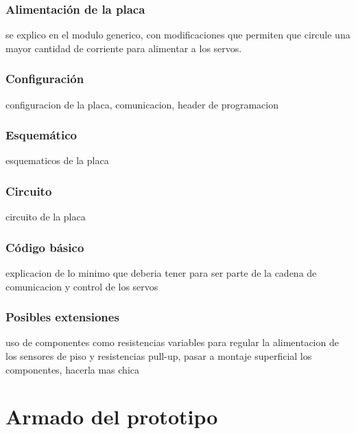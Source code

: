 \subsubsection{Alimentaci\'on de la placa}
\label{h_placas_servos_alimentacion}

se explico en el modulo generico, con modificaciones que permiten que circule una mayor cantidad de corriente para alimentar a los servos.

\subsubsection{Configuraci\'on}
\label{h_placas_servos_config}

configuracion de la placa, comunicacion, header de programacion

\subsubsection{Esquem\'atico}
\label{h_placas_servos_esquematico}

esquematicos de la placa

\subsubsection{Circuito}
\label{h_placas_servos_circuito}

circuito de la placa

\subsubsection{C\'odigo b\'asico}
\label{h_placas_servos_codigo}

explicacion de lo minimo que deberia tener para ser parte de la cadena de comunicacion y control de los servos

\subsubsection{Posibles extensiones}
\label{h_placas_servos_extensiones}

uso de componentes como resistencias variables para regular la alimentacion de los sensores de piso y resistencias pull-up, pasar a montaje superficial los componentes, hacerla mas chica

\section{Armado del prototipo}
\label{h_prototipo}

